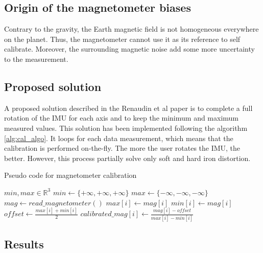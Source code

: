 \documentclass{article}
\begin{document}
\subsection{Origin of the magnetometer biases}

Contrary to the gravity, the Earth magnetic field is not homogeneous everywhere on the planet. Thus, the magnetometer cannot use it as its reference to self calibrate. Moreover, the surrounding magnetic noise add some more uncertainty to the measurement. 

\subsection{Proposed solution}

A proposed solution described in the Renaudin et al paper \cite{renaudin} is to complete a full rotation of the IMU for each axis and to keep the minimum and maximum measured values. This solution has been implemented following the algorithm \ref{alg:cal_algo}. It loops for each data measurement, which means that the calibration is performed on-the-fly. The more the user rotates the IMU, the better. However, this process partially solve only soft and hard iron distortion.

\begin{algorithm}[H]
    \caption{Pseudo code for magnetometer calibration}
    \label{alg:cal_algo}
    \begin{algorithmic}[1]
        \STATE $min, max \in \mathbb{R}^3$
        \STATE $min \leftarrow \{+\infty, +\infty, +\infty\}$
        \STATE $max \leftarrow \{-\infty, -\infty, -\infty\}$
                \STATE $ mag \leftarrow read\_magnetometer() $
                        \STATE $ max[i] \leftarrow mag[i] $
                        \STATE $ min[i] \leftarrow mag[i] $
                    \ENDIF
                    \STATE $offset \leftarrow \frac{max[i]+min[i]}{2} $
                    \STATE $ calibrated\_mag[i] \leftarrow \frac{mag[i]-offset}{max[i]-min[i]} $
                \ENDFOR
            \ENDIF
        \ENDWHILE
    \end{algorithmic}
\end{algorithm}

\vspace{0mm}

\subsection{Results}
\end{document}
